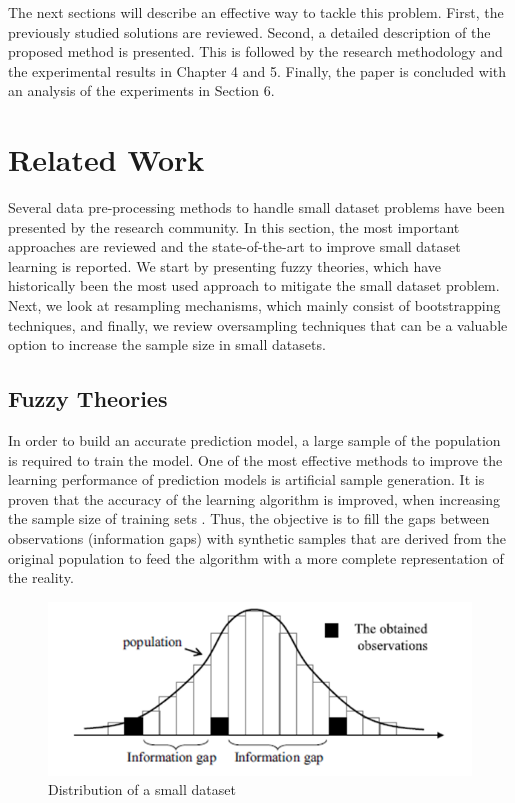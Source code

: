 \documentclass[parskip=full]{scrartcl}
\begin{document}
The next sections will describe an effective way to tackle this problem. First,
the previously studied solutions are reviewed. Second, a detailed description of the proposed method is presented. This is followed by the research methodology and the experimental results in Chapter 4 and 5. Finally, the paper is concluded with an analysis of the experiments in Section 6.

\section{Related Work}
Several data pre-processing methods to handle small dataset problems have been
presented by the research community. In this section, the most important
approaches are reviewed and the state-of-the-art to improve small dataset
learning is reported. We start by presenting fuzzy theories, which have 
historically been the most used approach to mitigate the small dataset problem. 
Next, we look at resampling mechanisms, which mainly consist of bootstrapping 
techniques, and finally, we review oversampling techniques that can be a 
valuable option to increase the sample size in small datasets.

\subsection{Fuzzy Theories}

In order to build an accurate prediction model, a large sample of the population
is required to train the model. One of the most effective methods to improve the learning performance of prediction models is artificial sample generation. It is proven that the accuracy of the learning algorithm is improved, when increasing the sample size of training sets \cite{AbdulLateh.2017}. Thus, the objective is to fill the gaps between observations (information gaps) with synthetic samples that are derived from the original population to feed the algorithm with a more complete representation of the reality.

\begin{figure}[H]
	\centering
	\includegraphics[width=0.6\linewidth]{"./Resources/small_data_distribution"}
	\caption{Distribution of a small dataset}
	\label{fig:small-data-distribution}
\end{figure}
\end{document}
